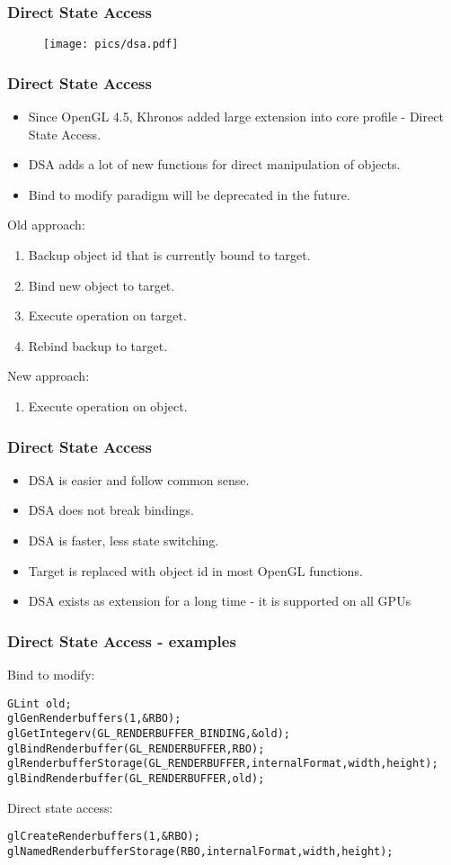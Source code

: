 \begin{frame}[fragile]
\frametitle{Direct State Access}
	\begin{figure}[h]
	\texttt{[image: pics/dsa.pdf]}
	\end{figure}
\end{frame}

\begin{frame}
  \frametitle{Direct State Access}
  \begin{itemize}
    \item Since OpenGL 4.5, Khronos added large extension into core profile - Direct State Access.
    \item DSA adds a lot of new functions for direct manipulation of objects.
    \item Bind to modify paradigm will be deprecated in the future.
  \end{itemize}
  Old approach:
  \begin{enumerate}
    \item Backup object id that is currently bound to target.
    \item Bind new object to target.
    \item Execute operation on target.
    \item Rebind backup to target.
  \end{enumerate}
  New approach:
  \begin{enumerate}
    \item Execute operation on object.
  \end{enumerate}
\end{frame}

\begin{frame}
  \frametitle{Direct State Access}
  \begin{itemize}
    \item DSA is easier and follow common sense.
    \item DSA does not break bindings.
    \item DSA is faster, less state switching.
    \item Target is replaced with object id in most OpenGL functions.
    \item DSA exists as extension for a long time - it is supported on all GPUs
  \end{itemize}
\end{frame}

\begin{frame}[fragile]
  \frametitle{Direct State Access - examples}
    Bind to modify:
    {\scriptsize
    \begin{verbatim}
GLint old;
glGenRenderbuffers(1,&RBO);
glGetIntegerv(GL_RENDERBUFFER_BINDING,&old);
glBindRenderbuffer(GL_RENDERBUFFER,RBO);
glRenderbufferStorage(GL_RENDERBUFFER,internalFormat,width,height);
glBindRenderbuffer(GL_RENDERBUFFER,old);
    \end{verbatim}
    }
    Direct state access:
    {\scriptsize
    \begin{verbatim}
glCreateRenderbuffers(1,&RBO);
glNamedRenderbufferStorage(RBO,internalFormat,width,height);
    \end{verbatim}
    }
\end{frame}

